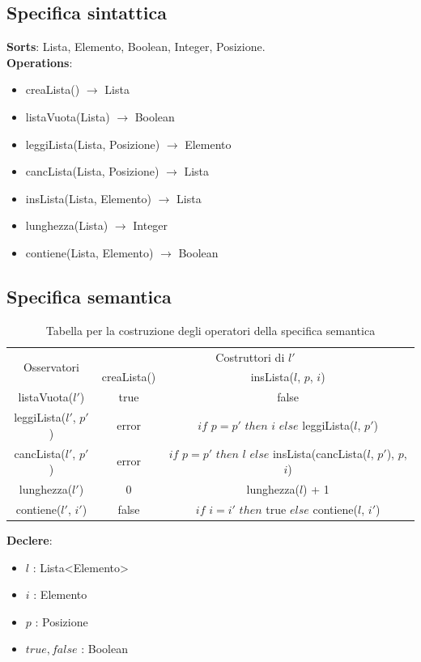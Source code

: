 \documentclass[italian,12pt,a4paper]{article}
\begin{document}
	\subsection{Specifica sintattica}
	
	\textbf{Sorts}: Lista, Elemento, Boolean, Integer, Posizione. \\
	\linebreak
	\textbf{Operations}:
	\begin{itemize}
		\item creaLista() $\rightarrow$ Lista
		\item listaVuota(Lista) $\rightarrow$ Boolean
		\item leggiLista(Lista, Posizione) $\rightarrow$ Elemento
		\item cancLista(Lista, Posizione) $\rightarrow$ Lista
		\item insLista(Lista, Elemento) $\rightarrow$ Lista
		\item lunghezza(Lista) $\rightarrow$ Integer
		\item contiene(Lista, Elemento) $\rightarrow$ Boolean
	\end{itemize}
	
	\subsection{Specifica semantica}
	
	\begin{table}[!ht]
		\centering
		\renewcommand{\arraystretch}{1.5}
		\begin{tabular}{|c|c|c|}
			\hline
			\multirow{2}{*}{Osservatori} & \multicolumn{2}{c|}{Costruttori di $l'$} \\
			\cline{2-3}
			& creaLista() & insLista($l$, $p$, $i$) \\
			\hline
			listaVuota($l'$) & true & false \\
			\hline
			leggiLista($l'$, $p'$) & error & $if$ $p=p'$ $then$ $i$ $else$ leggiLista($l$, $p'$) \\
			\hline
			cancLista($l'$, $p'$) & error & $if$ $p=p'$ $then$ $l$ $else$ insLista(cancLista($l$, $p'$), $p$, $i$) \\
			\hline
			lunghezza($l'$) & 0 & lunghezza($l$) + 1 \\
			\hline
			contiene($l'$, $i'$) & false & $if$ $i=i'$ $then$ true $else$ contiene($l$, $i'$)  \\
			\hline

		\end{tabular}
		\caption{Tabella per la costruzione degli operatori della specifica semantica}
		\label{tab:esempio}
	\end{table}
	\textbf{Declere}:
	\begin{itemize}
		\item $l$ : Lista<Elemento>
		\item $i$ : Elemento
		\item $p$ : Posizione
		\item ${true, false}$ : Boolean
	\end{itemize}
	
\end{document}
